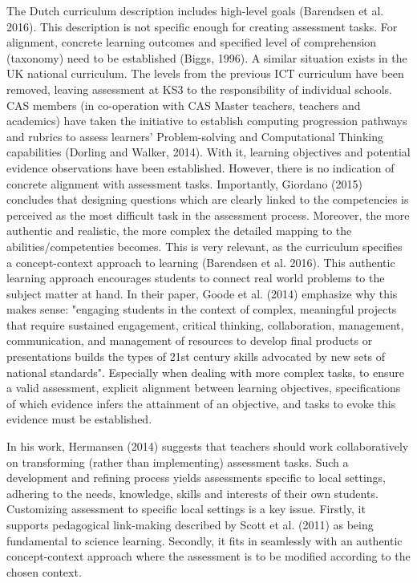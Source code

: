 The Dutch curriculum description includes high-level goals (Barendsen et al. 2016). This description is not specific enough for creating assessment tasks. For alignment, concrete learning outcomes and specified level of comprehension (taxonomy) need to be established (Biggs, 1996). A similar situation exists in the UK national curriculum. The levels from the previous ICT curriculum have been removed, leaving assessment at KS3 to the responsibility of individual schools. CAS members (in co-operation with CAS Master teachers, teachers and academics) have taken the initiative to establish computing progression pathways and rubrics to assess learners' Problem-solving and Computational Thinking capabilities (Dorling and Walker, 2014). With it, learning objectives and potential evidence observations have been established. However, there is no indication of concrete alignment with assessment tasks. Importantly, Giordano (2015) concludes that designing questions which are clearly linked to the competencies is perceived as the most difficult task in the assessment process. Moreover, the more authentic and realistic, the more complex the detailed mapping to the abilities/competenties becomes. This is very relevant, as the curriculum specifies a concept-context approach to learning (Barendsen et al. 2016). This authentic learning approach encourages students to connect real world problems to the subject matter at hand. In their paper, Goode et al. (2014) emphasize why this makes sense: "engaging students in the context of complex, meaningful projects that require sustained engagement, critical thinking, collaboration, management, communication, and management of resources to develop final products or presentations builds the types of 21st century skills advocated by new sets of national standards". Especially when dealing with more complex tasks, to ensure a valid assessment, explicit alignment between learning objectives, specifications of which evidence infers the attainment of an objective, and tasks to evoke this evidence must be established.


In his work, Hermansen (2014) suggests that teachers should work collaboratively on transforming (rather than implementing) assessment tasks. Such a development and refining process yields assessments specific to local settings, adhering to the needs, knowledge, skills and interests of their own students. Customizing assessment to specific local settings is a key issue. Firstly, it supports pedagogical link-making described by Scott et al. (2011) as being fundamental to science learning. Secondly, it fits in seamlessly with an authentic concept-context approach where the assessment is to be modified according to the chosen context.


